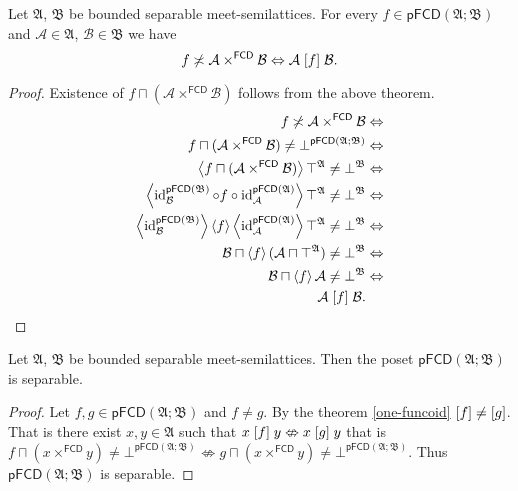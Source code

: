 \begin{cor}
\label{pf-intr-prod}Let $\mathfrak{A}$, $\mathfrak{B}$ be
bounded separable meet-semilattices. For every $f\in\mathsf{pFCD}(\mathfrak{A};\mathfrak{B})$
and $\mathcal{A}\in\mathfrak{A}$, $\mathcal{B}\in\mathfrak{B}$ we
have
\[
f\not\asymp\mathcal{A}\times^{\mathsf{FCD}}\mathcal{B}\Leftrightarrow\mathcal{A}\mathrel{\left[f\right]}\mathcal{B}.
\]
\end{cor}
\begin{proof}
Existence of $f\sqcap(\mathcal{A}\times^{\mathsf{FCD}}\mathcal{B})$ follows from the above theorem.
\begin{align*}
f\not\asymp\mathcal{A}\times^{\mathsf{FCD}}\mathcal{B} & \Leftrightarrow\\
f\sqcap(\mathcal{A}\times^{\mathsf{FCD}}\mathcal{B})\ne\bot^{\mathsf{pFCD}(\mathfrak{A};\mathfrak{B})} & \Leftrightarrow\\
\left\langle f\sqcap(\mathcal{A}\times^{\mathsf{FCD}}\mathcal{B})\right\rangle\top^{\mathfrak{A}}\ne\bot^{\mathfrak{B}} & \Leftrightarrow\\
\left\langle \operatorname{id}_{\mathcal{B}}^{\mathsf{pFCD}(\mathfrak{B})}\circ f\circ\operatorname{id}_{\mathcal{A}}^{\mathsf{pFCD}(\mathfrak{A})}\right\rangle\top^{\mathfrak{A}}\ne\bot^{\mathfrak{B}} & \Leftrightarrow\\
\left\langle \operatorname{id}_{\mathcal{B}}^{\mathsf{pFCD}(\mathfrak{B})}\right\rangle\left\langle f\right\rangle\left\langle \operatorname{id}_{\mathcal{A}}^{\mathsf{pFCD}(\mathfrak{A})}\right\rangle\top^{\mathfrak{A}}\ne\bot^{\mathfrak{B}} & \Leftrightarrow\\
\mathcal{B}\sqcap\left\langle f\right\rangle(\mathcal{A}\sqcap\top^{\mathfrak{A}})\ne\bot^{\mathfrak{B}} & \Leftrightarrow\\
\mathcal{B}\sqcap\left\langle f\right\rangle\mathcal{A}\ne\bot^{\mathfrak{B}} & \Leftrightarrow\\
\mathcal{A}\mathrel{\left[f\right]}\mathcal{B}.
\end{align*}
\end{proof}
\begin{thm}
\label{pf-fcd-sep}Let $\mathfrak{A}$, $\mathfrak{B}$ be bounded separable meet-semilattices. Then the poset $\mathsf{pFCD}(\mathfrak{A};\mathfrak{B})$
is separable.\end{thm}
\begin{proof}
Let $f,g\in\mathsf{pFCD}(\mathfrak{A};\mathfrak{B})$ and $f\neq g$.
By the theorem \ref{one-funcoid} $\mathord{\mathrel{\left[f\right]}}\neq\mathord{\mathrel{\left[g\right]}}$.
That is there exist $x,y\in\mathfrak{A}$ such that $x\mathrel{\left[f\right]}y\nLeftrightarrow x\mathrel{\left[g\right]}y$
that is $f\sqcap(x\times^{\mathsf{FCD}}y)\neq\bot^{\mathsf{pFCD}(\mathfrak{A};\mathfrak{B})}\nLeftrightarrow g\sqcap(x\times^{\mathsf{FCD}}y)\neq\bot^{\mathsf{pFCD}(\mathfrak{A};\mathfrak{B})}$.
Thus $\mathsf{pFCD}(\mathfrak{A};\mathfrak{B})$ is separable.\end{proof}


